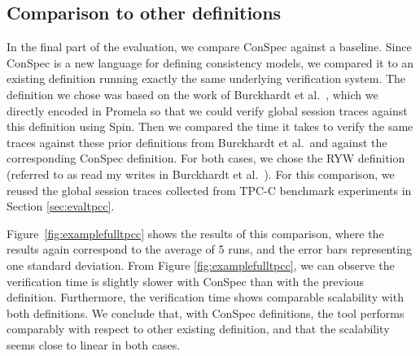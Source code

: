 \documentclass[conference]{IEEEtran}
\begin{document}
	\subsection{Comparison to other definitions}\label{sec:evalcompar}
	
	
	In the final part of the evaluation, we compare ConSpec against a baseline. Since ConSpec is a new language for defining consistency models, we compared it to an existing definition running exactly the same underlying verification system. The definition we chose was based on the work of Burckhardt et al.~\cite{DBLP:journals/ftpl/Burckhardt14}, which we directly encoded in Promela so that we could verify global session traces against this definition using Spin.  Then we compared the time it takes to verify the same traces against these prior definitions from Burckhardt et al.\ and against the corresponding ConSpec definition. For both cases, we chose the RYW definition (referred to as read my writes in Burckhardt et al.~\cite{Burckhardt:2014:PEC:2693641.2693642}). %
	For this comparison, we reused the global session traces collected from TPC-C benchmark experiments in Section \ref{sec:evaltpcc}.
	
	Figure~\ref{fig:examplefulltpcc} shows the results of this comparison, where the results again correspond to the average of 5 runs, and the error bars representing one standard deviation. From Figure \ref{fig:examplefulltpcc}, we can observe the verification time is slightly slower with ConSpec than with the previous definition. Furthermore, the verification time shows comparable scalability with both definitions. %
	We conclude that, with ConSpec definitions, the tool performs comparably with respect to other existing definition, and that the scalability seems close to linear in both cases.
	
\end{document}
